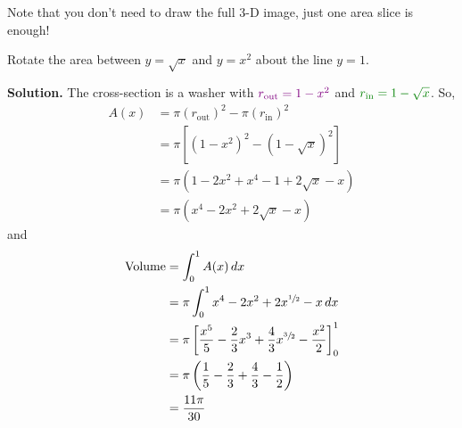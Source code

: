 Note that you don't need to draw the full 3-D image, just one area slice is enough!

\begin{Example}{}{}
    Rotate the area between $ y=\sqrt{x} $ and $ y=x^2 $ about the line $ y=1 $.

    \begin{center}
    \end{center}

    \textbf{Solution.} The cross-section is a washer with $ \color[rgb]{0.5,0,0.5}r_{\text{out}}=1-x^2 $ and
    $ \color[rgb]{0,0.5,0} r_{\text{in}}=1-\sqrt{x} $. So,
    \begin{align*}
        A(x)
         & =\pi(r_{\text{out}})^2-\pi(r_\text{in})^2   \\
         & =\pi\left[ (1-x^2)^2-(1-\sqrt{x})^2 \right] \\
         & =\pi(1-2x^2+x^4-1+2\sqrt{x}-x)              \\
         & =\pi(x^4-2x^2+2\sqrt{x}-x)
    \end{align*}
    and
    \begin{align*}
        \text{Volume}
         & =\int_{0}^{1} A(x)\, d{x}                                                                        \\
         & =\pi \int_{0}^{1} x^4-2x^2+2x^{\sfrac{1}{2}}-x\, d{x}                                            \\
         & =\pi\left[ \frac{x^5}{5} -\frac{2}{3} x^3+\frac{4}{3} x^{\sfrac{3}{2}}-\frac{x^2}{2} \right]_0^1 \\
         & =\pi\left( \frac{1}{5} -\frac{2}{3} +\frac{4}{3} -\frac{1}{2} \right)                            \\
         & =\frac{11\pi}{30}
    \end{align*}
\end{Example}


